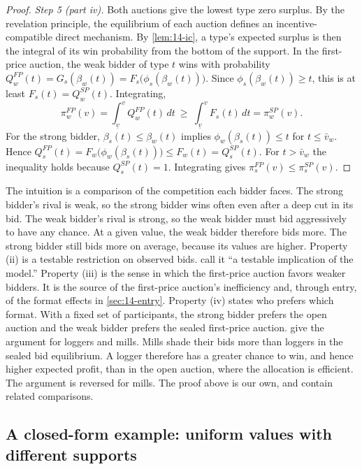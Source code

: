\begin{proof}
\emph{Step 5 (part iv).} Both auctions give the lowest type zero surplus. By the revelation principle,
the equilibrium of each auction defines an incentive-compatible direct mechanism. By
\cref{lem:14-ic}, a type's expected surplus is then the integral of its win probability from the
bottom of the support. In the first-price auction, the weak bidder of type $t$ wins with
probability $Q_w^{FP}(t)=G_s(\beta_w(t))=F_s\bigl(\phi_s(\beta_w(t))\bigr)$. Since
$\phi_s(\beta_w(t))\ge t$, this is at least $F_s(t)=Q_w^{SP}(t)$. Integrating,
\[
\pi_w^{FP}(v)=\int_{\underline v}^{v}Q_w^{FP}(t)\,dt\ \ge\ \int_{\underline v}^{v}F_s(t)\,dt=\pi_w^{SP}(v).
\]
For the strong bidder, $\beta_s(t)\le\beta_w(t)$ implies $\phi_w(\beta_s(t))\le t$ for $t\le\bar v_w$.
Hence $Q_s^{FP}(t)=F_w\bigl(\phi_w(\beta_s(t))\bigr)\le F_w(t)=Q_s^{SP}(t)$. For $t>\bar v_w$ the
inequality holds because $Q_s^{SP}(t)=1$. Integrating gives $\pi_s^{FP}(v)\le\pi_s^{SP}(v)$.
\end{proof}

The intuition is a comparison of the competition each bidder faces. The strong bidder's rival is
weak, so the strong bidder wins often even after a deep cut in its bid. The weak bidder's rival is
strong, so the weak bidder must bid aggressively to have any chance. At a given value, the weak
bidder therefore bids more. The strong bidder still bids more on average, because its values are
higher. Property (ii) is a testable restriction on observed bids. \citet[Section
II.B]{AtheyLevinSeira2011} call it ``a testable implication of the model.'' Property (iii) is the
sense in which the first-price auction favors weaker bidders. It is the source of the first-price
auction's inefficiency and, through entry, of the format effects in \cref{sec:14-entry}. Property
(iv) states who prefers which format. With a fixed set of participants, the strong bidder prefers
the open auction and the weak bidder prefers the sealed first-price auction.
\citet[Section~II.D, p.~215]{AtheyLevinSeira2011} give the argument for loggers and mills. Mills
shade their bids more than loggers in the sealed bid equilibrium. A logger therefore has a greater chance
to win, and hence higher expected profit, than in the open auction, where the allocation is efficient.
The argument is reversed for mills. The proof above is our own, and \citet{MaskinRiley2000} contain
related comparisons.

\subsection{A closed-form example: uniform values with different supports}\label{sec:14-asym-uniform}

